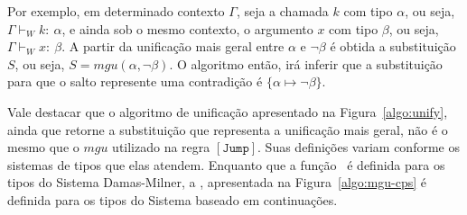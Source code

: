 \begin{prooftree}
\end{prooftree}
Por exemplo, em determinado contexto $\Gamma$, seja a chamada $k$ com tipo $\alpha$, ou seja, $\Gamma \vdash_W k{:}\ \alpha$, e ainda sob o mesmo contexto, o argumento $x$ com tipo $\beta$, ou seja, $\Gamma \vdash_W x{:}\ \beta$.
A partir da unificação mais geral entre $\alpha$ e $\neg\beta$ é obtida a substituição $S$, ou seja, $S = \mathit{mgu}(\alpha, \neg\beta)$.
O algoritmo então, irá inferir que a substituição para que o salto represente uma contradição é $\{\alpha \mapsto \neg\beta\}$.

Vale destacar que o algoritmo de unificação apresentado na Figura~\ref{algo:unify}, ainda que retorne a substituição que representa a unificação mais geral, não é o mesmo que o $\mathit{mgu}$ utilizado na regra $[\mathtt{Jump}]$.
Suas definições variam conforme os sistemas de tipos que elas atendem.
Enquanto que a função \Unify\ é definida para os tipos do Sistema Damas-Milner, a \Mgu, apresentada na Figura~\ref{algo:mgu-cps} é definida para os tipos do Sistema baseado em continuações.

